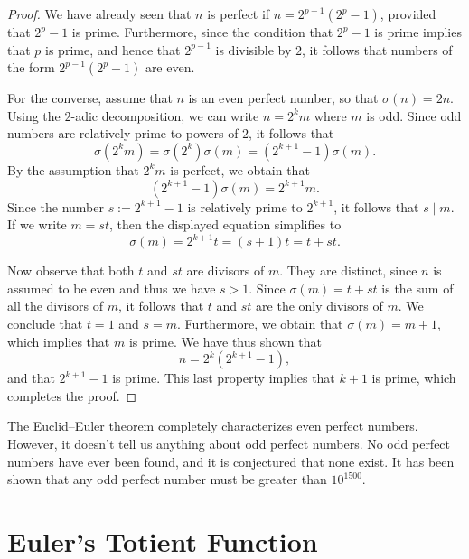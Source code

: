 \begin{proof}
  We have already seen that $n$ is perfect if $n=2^{p-1}(2^p-1)$, provided that $2^p-1$ is prime. Furthermore, since the condition that $2^p-1$ is prime implies that $p$ is prime, and hence that $2^{p-1}$ is divisible by $2$, it follows that numbers of the form $2^{p-1}(2^p-1)$ are even.

  For the converse, assume that $n$ is an even perfect number, so that $\sigma(n)=2n$. Using the $2$-adic decomposition, we can write $n=2^km$ where $m$ is odd. Since odd numbers are relatively prime to powers of $2$, it follows that
  \begin{equation*}
    \sigma(2^km)=\sigma(2^k)\sigma(m)=(2^{k+1}-1)\sigma(m).
  \end{equation*}
  By the assumption that $2^km$ is perfect, we obtain that
  \begin{equation*}
    (2^{k+1}-1)\sigma(m)=2^{k+1}m.
  \end{equation*}
  Since the number $s:=2^{k+1}-1$ is relatively prime to $2^{k+1}$, it follows that $s\mid m$. If we write $m=st$, then the displayed equation simplifies to
  \begin{equation*}
    \sigma(m)=2^{k+1}t=(s+1)t=t+st.
  \end{equation*}
  
  Now observe that both $t$ and $st$ are divisors of $m$. They are distinct, since $n$ is assumed to be even and thus we have $s>1$. Since $\sigma(m)=t+st$ is the sum of all the divisors of $m$, it follows that $t$ and $st$ are the only divisors of $m$. We conclude that $t=1$ and $s=m$. Furthermore, we obtain that $\sigma(m)=m+1$, which implies that $m$ is prime. We have thus shown that
  \begin{equation*}
    n=2^k(2^{k+1}-1),
  \end{equation*}
  and that $2^{k+1}-1$ is prime. This last property implies that $k+1$ is prime, which completes the proof.
\end{proof}

The Euclid--Euler theorem completely characterizes even perfect numbers. However, it doesn't tell us anything about odd perfect numbers. No odd perfect numbers have ever been found, and it is conjectured that none exist. It has been shown that any odd perfect number must be greater than $10^{1500}$. 

\section{Euler's Totient Function}

